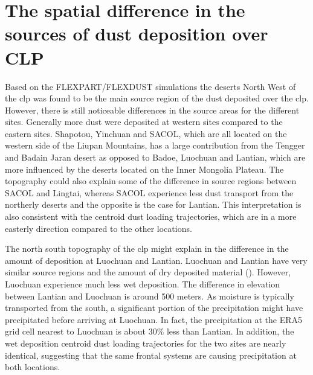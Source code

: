\section{The spatial difference in the sources of dust deposition over CLP}\label{sec:spatial_differences}
Based on the FLEXPART/FLEXDUST simulations the deserts North West of the \acrshort{clp} was found to be the main source region of the dust deposited over the \acrshort{clp}. However, there is still noticeable differences in the source areas for the different sites. Generally more dust were deposited at western sites compared to the eastern sites.  Shapotou, Yinchuan and SACOL, which are all located on the western side of the Liupan Mountains, has a large contribution from the Tengger and Badain Jaran desert as opposed to Badoe, Luochuan and Lantian, which are more influenced by the deserts located on the Inner Mongolia Plateau. The topography could also explain some of the difference in source regions between SACOL and Lingtai, whereas SACOL experience less dust transport from the northerly deserts and the opposite is the case for Lantian. This interpretation is also consistent with the centroid dust loading trajectories, which are in a more easterly direction compared to the other locations. 

The north south topography of the \acrshort{clp} might explain in the difference in the amount of deposition at Luochuan and Lantian. Luochuan and Lantian have very similar source regions and the amount of dry deposited material (). However, Luochuan experience much less wet deposition. The difference in elevation between Lantian and Luochuan is around 500 meters. As moisture is typically transported from the south, a significant portion of the precipitation might have precipitated before arriving at Luochuan. In fact, the precipitation at the ERA5 grid cell nearest to Luochuan is about 30\% less than Lantian. In addition, the wet deposition centroid dust loading trajectories for the two sites are nearly identical, suggesting that the same frontal systems are causing precipitation at both locations.              



